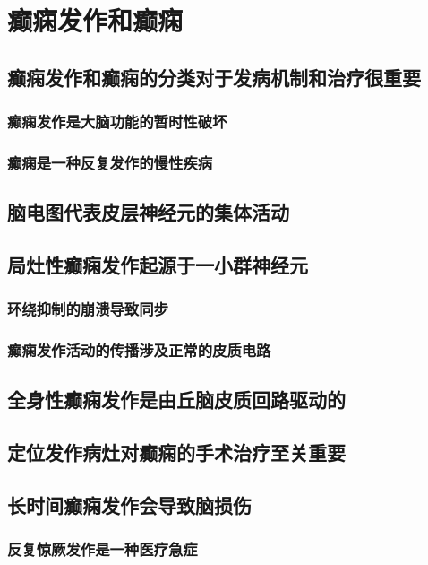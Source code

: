\chapter{癫痫发作和癫痫}

\section{癫痫发作和癫痫的分类对于发病机制和治疗很重要}
\subsection{癫痫发作是大脑功能的暂时性破坏}
\subsection{癫痫是一种反复发作的慢性疾病}

\section{脑电图代表皮层神经元的集体活动}

\section{局灶性癫痫发作起源于一小群神经元}
\subsection{环绕抑制的崩溃导致同步}
\subsection{癫痫发作活动的传播涉及正常的皮质电路}

\section{全身性癫痫发作是由丘脑皮质回路驱动的}

\section{定位发作病灶对癫痫的手术治疗至关重要}

\section{长时间癫痫发作会导致脑损伤}
\subsection{反复惊厥发作是一种医疗急症}
